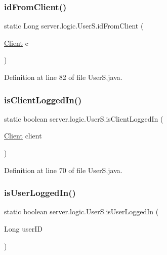 \subsubsection{\texorpdfstring{id\+From\+Client()}{idFromClient()}}
{\footnotesize\ttfamily static Long server.\+logic.\+User\+S.\+id\+From\+Client (\begin{DoxyParamCaption}\item[{\hyperlink{classserver_1_1conn_1_1_client}{Client}}]{c }\end{DoxyParamCaption})\hspace{0.3cm}{\ttfamily [static]}}



Definition at line 82 of file User\+S.\+java.

\hypertarget{classserver_1_1logic_1_1_user_s_a3b607236a7ddfef3cbf2eaa4081fad63}{}\label{classserver_1_1logic_1_1_user_s_a3b607236a7ddfef3cbf2eaa4081fad63} 
\subsubsection{\texorpdfstring{is\+Client\+Logged\+In()}{isClientLoggedIn()}}
{\footnotesize\ttfamily static boolean server.\+logic.\+User\+S.\+is\+Client\+Logged\+In (\begin{DoxyParamCaption}\item[{\hyperlink{classserver_1_1conn_1_1_client}{Client}}]{client }\end{DoxyParamCaption})\hspace{0.3cm}{\ttfamily [static]}}



Definition at line 70 of file User\+S.\+java.

\hypertarget{classserver_1_1logic_1_1_user_s_a09f700aec7a39a479f99953248adabd3}{}\label{classserver_1_1logic_1_1_user_s_a09f700aec7a39a479f99953248adabd3} 
\subsubsection{\texorpdfstring{is\+User\+Logged\+In()}{isUserLoggedIn()}}
{\footnotesize\ttfamily static boolean server.\+logic.\+User\+S.\+is\+User\+Logged\+In (\begin{DoxyParamCaption}\item[{Long}]{user\+ID }\end{DoxyParamCaption})\hspace{0.3cm}{\ttfamily [static]}}



